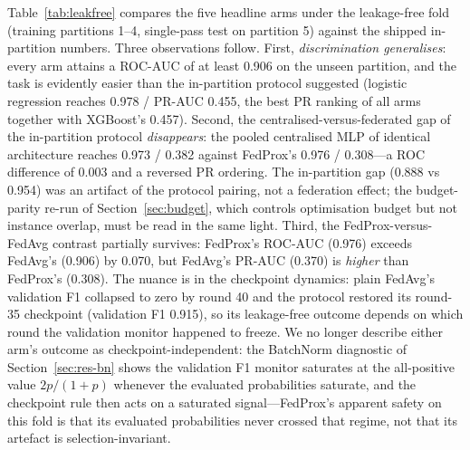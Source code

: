 Table~\ref{tab:leakfree} compares the five headline arms under the
leakage-free fold (training partitions 1--4, single-pass test on
partition 5) against the shipped in-partition numbers. Three
observations follow. First, \emph{discrimination generalises}: every
arm attains a ROC-AUC of at least 0.906 on the unseen partition, and
the task is evidently easier than the in-partition protocol suggested
(logistic regression reaches 0.978 / PR-AUC 0.455, the best PR ranking
of all arms together with XGBoost's 0.457). Second, the
centralised-versus-federated gap of the in-partition protocol
\emph{disappears}: the pooled centralised MLP of identical architecture
reaches 0.973 / 0.382 against FedProx's 0.976 / 0.308---a ROC
difference of 0.003 and a reversed PR ordering. The in-partition gap
(0.888 vs 0.954) was an artifact of the protocol pairing, not a
federation effect; the budget-parity re-run of
Section~\ref{sec:budget}, which controls optimisation budget but not
instance overlap, must be read in the same light. Third, the
FedProx-versus-FedAvg contrast partially survives: FedProx's ROC-AUC
(0.976) exceeds FedAvg's (0.906) by 0.070, but FedAvg's PR-AUC (0.370)
is \emph{higher} than FedProx's (0.308). The nuance is in the
checkpoint dynamics: plain FedAvg's validation F1 collapsed to zero by
round 40 and the protocol restored its round-35 checkpoint (validation
F1 0.915), so its leakage-free outcome depends on which round the
validation monitor happened to freeze. We no longer describe either
arm's outcome as checkpoint-independent: the BatchNorm diagnostic of
Section~\ref{sec:res-bn} shows the validation F1 monitor saturates at
the all-positive value $2p/(1+p)$ whenever the evaluated probabilities
saturate, and the checkpoint rule then acts on a saturated
signal---FedProx's apparent safety on this fold is that its evaluated
probabilities never crossed that regime, not that its artefact is
selection-invariant.

